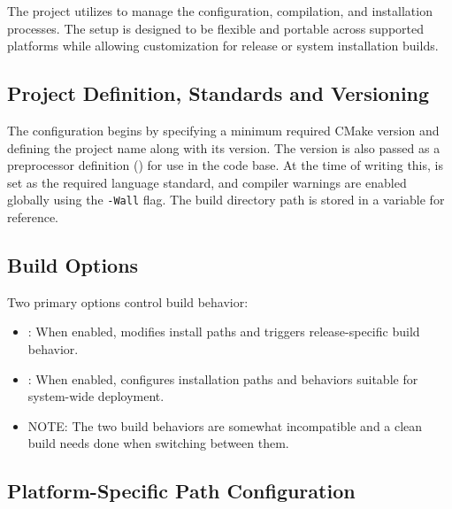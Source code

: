 The  project utilizes  to manage the  configuration, compilation, and installation processes. The setup is designed to be flexible and portable across supported platforms while allowing customization for release or system installation builds.

\subsection{Project Definition, Standards and Versioning}

The  configuration begins by specifying a minimum required CMake version and defining the project name  along with its version. The version is also passed as a preprocessor definition () for use in the code base. At the time of writing this,  is set as the required language standard, and compiler warnings are enabled globally using the \texttt{-Wall} flag. The build directory path is stored in a variable for reference.

\subsection{Build Options}

Two primary options control build behavior:
\begin{itemize}\itemsep0em
	\item {}: When enabled, modifies install paths and triggers release-specific build behavior.
	\item {}: When enabled, configures installation paths and behaviors suitable for system-wide deployment.
	\item NOTE: The two build behaviors are somewhat incompatible and a clean build needs done when switching between them.
\end{itemize}

\subsection{Platform-Specific Path Configuration}\label{section:platform_specific_path_configurations}

